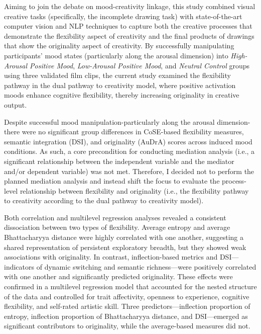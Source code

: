 \documentclass[../MA_Thesis.tex]{subfiles}
\begin{document}
Aiming to join the debate on mood-creativity linkage, this study combined visual creative tasks (specifically, the incomplete drawing task) with state-of-the-art computer vision and NLP techniques to capture both the creative processes that demonstrate the flexibility aspect of creativity and the final products of drawings that show the originality aspect of creativity. By successfully manipulating participants’ mood states (particularly along the arousal dimension) into \textit{High-Arousal Positive Mood}, \textit{Low-Arousal Positive Mood}, and \textit{Neutral Control} groups using three validated film clips, the current study examined the flexibility pathway in the dual pathway to creativity model, where positive activation moods enhance cognitive flexibility, thereby increasing originality in creative output.

Despite successful mood manipulation-particularly along the arousal dimension-there were no significant group differences in CoSE-based flexibility measures, semantic integration (DSI), and originality (AuDrA) scores across induced mood conditions. As such, a core precondition for conducting mediation analysis (i.e., a significant relationship between the independent variable and the mediator and/or dependent variable) was not met. Therefore, I decided not to perform the planned mediation analysis and instead shift the focus to evaluate the process-level relationship between flexibility and originality (i.e., the flexibility pathway to creativity according to the dual pathway to creativity model). 

Both correlation and multilevel regression analyses revealed a consistent dissociation between two types of flexibility. Average entropy and average Bhattacharyya distance were highly correlated with one another, suggesting a shared representation of persistent exploratory breadth, but they showed weak associations with originality. In contrast, inflection-based metrics and DSI—indicators of dynamic switching and semantic richness—were positively correlated with one another and significantly predicted originality. These effects were confirmed in a multilevel regression model that accounted for the nested structure of the data and controlled for trait affectivity, openness to experience, cognitive flexibility, and self-rated artistic skill. Three predictors—inflection proportion of entropy, inflection proportion of Bhattacharyya distance, and DSI—emerged as significant contributors to originality, while the average-based measures did not.  
\end{document}

